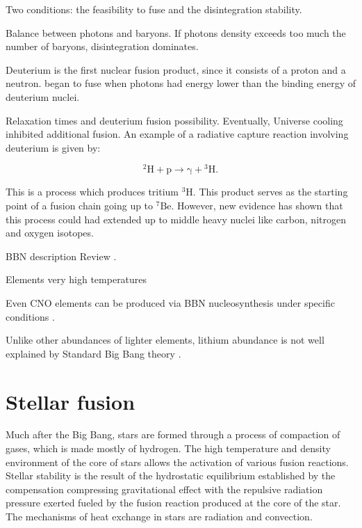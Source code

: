 \documentclass[openany]{book}
\begin{document}
Two conditions: the feasibility to fuse and the disintegration stability.

Balance between photons and baryons. If photons density exceeds too much the number of baryons, disintegration dominates. 

Deuterium is the first nuclear fusion product, since it  consists of a proton and a neutron. began to fuse when photons had  energy lower than the binding energy of deuterium nuclei. 

Relaxation times and deuterium fusion possibility. Eventually, Universe cooling inhibited additional fusion. An example of a radiative capture reaction involving deuterium is given by:

\begin{equation} \label{eq:reaction_2Hpradiative}
	\mathrm{{}^{2}H + p \rightarrow \gamma + {}^{3}H}.
\end{equation}

This is a process which produces tritium $\mathrm{{}^{3}H}$. This product serves as the starting point of a fusion chain going up to $\mathrm{{}^{7}Be}$. However, new evidence has shown that this process could had extended up to middle heavy nuclei like carbon, nitrogen and oxygen isotopes.

BBN description \cite{coc_vangioni_2010}
Review \cite{patrignani_et_particle-data-group_2016}.

Elements very high temperatures \cite{wagoner_fowler_hoyle_1967}

Even CNO elements can be produced via BBN nucleosynthesis under specific conditions \cite{su-qing_kai-su_yong-shou_neng-chuan_zhi-hong_2010}.

Unlike other abundances of lighter elements, lithium abundance is not well explained by Standard Big Bang theory \cite{bertulani_2019}. 


\section{Stellar fusion}  \label{sec:StellarFusion}

Much after the Big Bang, stars are formed through a process of compaction of gases, which is made mostly of hydrogen. The high temperature and density environment of the core of stars allows the activation of various fusion reactions.  \\

Stellar stability is the result of the hydrostatic equilibrium established by the compensation compressing gravitational effect with the repulsive radiation pressure exerted fueled by the fusion reaction produced at the core of the star. The mechanisms of heat exchange in stars are radiation and convection. \\
\end{document}

